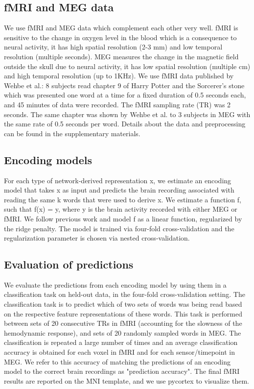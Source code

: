 \documentclass{article}
\begin{document}
\subsection{fMRI and MEG data} 
We use fMRI and MEG data which complement each other very well. fMRI is sensitive to the change in oxygen level in the blood which is a consequence to neural activity, it has high spatial resolution (2-3 mm) and low temporal resolution (multiple seconds). MEG measures the change in the magnetic field outside the skull due to neural activity, it has low spatial resolution (multiple cm) and high temporal resolution (up to 1KHz). We use fMRI data published by Wehbe et al.\cite{wehbe2014simultaneously}: 8 subjects read chapter 9 of Harry Potter and the Sorcerer’s stone\cite{rowling2012harry} which was presented one word at a time for a fixed duration of 0.5 seconds each, and 45 minutes of data were recorded. The fMRI sampling rate (TR) was 2 seconds. The same chapter was shown by Wehbe et al.\cite{wehbe2014aligning} to 3 subjects in MEG with the same rate of 0.5 seconds per word. Details about the data and preprocessing can be found in the supplementary materials.

\subsection{Encoding models} 
For each type of network-derived representation x, we estimate an encoding model that takes x as input and predicts the brain recording associated with reading the same k words that were used to derive x. We estimate a function f, such that f(x) = y, where y is the brain activity recorded with either MEG or fMRI. We follow previous work\cite{wehbe2014simultaneously} and model f as a linear function, regularized by the ridge penalty. The model is trained via four-fold cross-validation and the regularization parameter is chosen via nested cross-validation.

\subsection{Evaluation of predictions}
We evaluate the predictions from each encoding model by using them in
a classification task on held-out data, in the four-fold cross-validation setting. The classification task is to predict which of two sets of words was being read based on the respective feature representations of these words\cite{wehbe2014simultaneously,wehbe2014aligning}. This task is performed between sets of 20 consecutive TRs in fMRI (accounting for the slowness of the hemodynamic response), and sets of 20 randomly sampled words in MEG. The classification is repeated a large number of times and an average classification accuracy is obtained for each voxel in fMRI and for each sensor/timepoint in MEG. We refer to this accuracy of matching the predictions of an encoding model to the correct brain recordings as "prediction accuracy". The final fMRI results are reported on the MNI template, and we use pycortex to visualize them\cite{gao2015pycortex}. 
\end{document}
